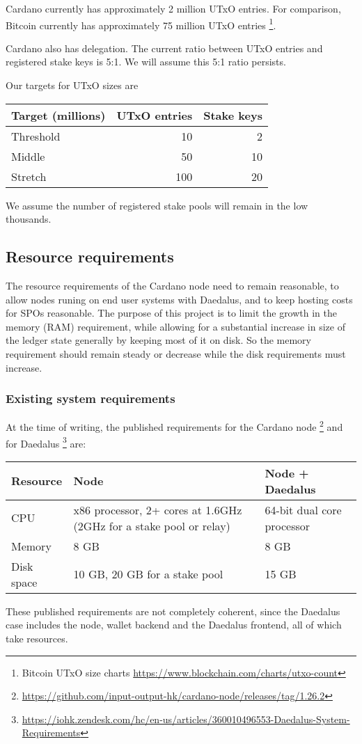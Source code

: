 \documentclass[11pt,a4paper]{article}
\begin{document}
Cardano currently has approximately 2 million UTxO entries. For comparison,
Bitcoin currently has approximately 75 million UTxO entries%
\footnote{Bitcoin UTxO size charts \url{https://www.blockchain.com/charts/utxo-count}}.

Cardano also has delegation. The current ratio between UTxO entries
and registered stake keys is 5:1. We will assume this 5:1 ratio persists.

Our targets for UTxO sizes are

\begin{center}
\begin{tabular}[]{lrr}
  Target (millions) & UTxO entries & Stake keys \\
  \toprule
  Threshold &  10  &  2 \\
  Middle    &  50  & 10 \\
  Stretch   & 100  & 20
\end{tabular}
\end{center}

We assume the number of registered stake pools will remain in the low thousands.

\subsection{Resource requirements}
\label{resource-requirements}

The resource requirements of the Cardano node need to remain reasonable, to
allow nodes runing on end user systems with Daedalus, and to keep hosting costs
for SPOs reasonable. The purpose of this project is to limit the growth in the
memory (RAM) requirement, while allowing for a substantial increase in size of
the ledger state generally by keeping most of it on disk. So the memory
requirement should remain steady or decrease while the disk requirements must
increase.

\subsubsection{Existing system requirements}

At the time of writing, the published requirements for the Cardano node%
\footnote{\url{https://github.com/input-output-hk/cardano-node/releases/tag/1.26.2}}
and for Daedalus%
\footnote{\url{https://iohk.zendesk.com/hc/en-us/articles/360010496553-Daedalus-System-Requirements}}
are:

\begin{center}
\begin{tabular}[]{lp{6cm}p{5cm}}
  Resource    & Node & Node + Daedalus \\
  \toprule
  CPU         &  x86 processor, 2+ cores at 1.6GHz (2GHz for a stake pool or relay)  & 64-bit dual core processor \\
  Memory      &  8 GB  & 8 GB \\
  Disk space  & 10 GB, 20 GB for a stake pool & 15 GB
\end{tabular}
\end{center}
These published requirements are not completely coherent, since the Daedalus
case includes the node, wallet backend and the Daedalus frontend, all of which
take resources.
\end{document}
